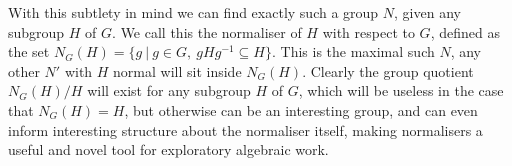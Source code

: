 With this subtlety in mind we can find exactly such a group $N$, given any subgroup $H$ of $G$. We call this the normaliser of $H$ with respect to $G$, defined as the set $N_G(H) = \{g\ |\ g \in G,\ gHg^{-1} \subseteq H\}$. This is the maximal such $N$, any other $N'$ with $H$ normal will sit inside $N_G(H)$. Clearly the group quotient $N_G(H)/H$ will exist for any subgroup $H$ of $G$, which will be useless in the case that $N_G(H) = H$, but otherwise can be an interesting group, and can even inform interesting structure about the normaliser itself, making normalisers a useful and novel tool for exploratory algebraic work.